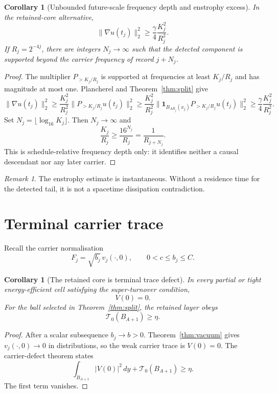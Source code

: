 \documentclass[11pt]{article}
\newtheorem{corollary}[theorem]{Corollary}
\theoremstyle{remark}
\newtheorem{remark}[theorem]{Remark}
\newcommand{\PhiHi}[1]{P_{>#1}}
\begin{document}
\begin{corollary}[Unbounded future-scale frequency depth and enstrophy excess]
\label{cor:depth}
In the retained-core alternative,
\[
 \boxed{
 \|\nabla u(t_j)\|_2^2
 \ge
 \frac{\gamma}{4}\frac{K_j^2}{R_j^2}.
 }
\]
If \(R_j=2^{-4j}\), there are integers \(N_j\to\infty\) such that the
detected component is supported beyond the carrier frequency of record
\(j+N_j\).
\end{corollary}

\begin{proof}
The multiplier \(\PhiHi{K_j/R_j}\) is supported at frequencies at least
\(K_j/R_j\) and has magnitude at most one.  Plancherel and
Theorem~\ref{thm:split} give
\[
 \|\nabla u(t_j)\|_2^2
 \ge
 \frac{K_j^2}{R_j^2}
 \|\PhiHi{K_j/R_j}u(t_j)\|_2^2
 \ge
 \frac{K_j^2}{R_j^2}
 \|\mathbf1_{B_{AR_j}(x_j)}
 \PhiHi{K_j/R_j}u(t_j)\|_2^2
 \ge
 \frac{\gamma}{4}\frac{K_j^2}{R_j^2}.
\]
Set \(N_j=\lfloor\log_{16}K_j\rfloor\).  Then \(N_j\to\infty\) and
\[
 \frac{K_j}{R_j}
 \ge
 \frac{16^{N_j}}{R_j}
 =
 \frac1{R_{j+N_j}}.
\]
This is schedule-relative frequency depth only: it identifies neither a
causal descendant nor any later carrier.
\end{proof}

\begin{remark}
The enstrophy estimate is instantaneous.  Without a residence time for the
detected tail, it is not a spacetime dissipation contradiction.
\end{remark}

\section{Terminal carrier trace}

Recall the carrier normalisation
\[
 F_j=\sqrt{b_j}\,v_j(\cdot,0),
 \qquad
 0<c\le b_j\le C.
\]

\begin{corollary}[The retained core is terminal trace defect]
\label{cor:defect}
In every partial or tight energy-efficient cell satisfying the
super-turnover condition,
\[
 \boxed{V(0)=0.}
\]
For the ball selected in Theorem~\ref{thm:split}, the retained layer obeys
\[
 \boxed{\mathcal T_0(B_{A+1})\ge\eta.}
\]
\end{corollary}

\begin{proof}
After a scalar subsequence \(b_j\to b>0\).
Theorem~\ref{thm:vacuum} gives \(v_j(\cdot,0)\to0\) in distributions, so
the weak carrier trace is \(V(0)=0\).  The carrier-defect theorem states
\[
 \int_{B_{A+1}}|V(0)|^2\,dy+\mathcal T_0(B_{A+1})\ge\eta.
\]
The first term vanishes.
\end{proof}
\end{document}
